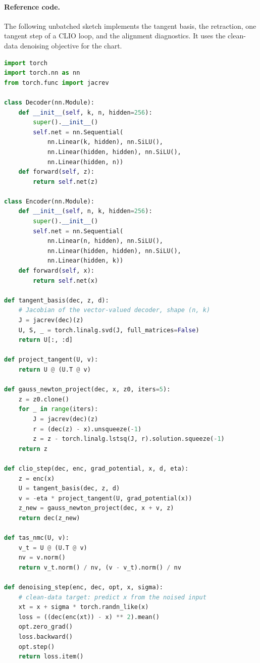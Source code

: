 \documentclass[11pt,a4paper]{article}
\theoremstyle{definition}
\theoremstyle{remark}
\begin{document}
\paragraph{Reference code.} The following unbatched sketch implements the
tangent basis, the retraction, one tangent step of a CLIO loop, and the
alignment diagnostics. It uses the clean-data denoising objective for the
chart.

\begin{lstlisting}[language=Python,caption={Tangent step, retraction and diagnostics (unbatched).}]
import torch
import torch.nn as nn
from torch.func import jacrev

class Decoder(nn.Module):
    def __init__(self, k, n, hidden=256):
        super().__init__()
        self.net = nn.Sequential(
            nn.Linear(k, hidden), nn.SiLU(),
            nn.Linear(hidden, hidden), nn.SiLU(),
            nn.Linear(hidden, n))
    def forward(self, z):
        return self.net(z)

class Encoder(nn.Module):
    def __init__(self, n, k, hidden=256):
        super().__init__()
        self.net = nn.Sequential(
            nn.Linear(n, hidden), nn.SiLU(),
            nn.Linear(hidden, hidden), nn.SiLU(),
            nn.Linear(hidden, k))
    def forward(self, x):
        return self.net(x)

def tangent_basis(dec, z, d):
    # Jacobian of the vector-valued decoder, shape (n, k)
    J = jacrev(dec)(z)
    U, S, _ = torch.linalg.svd(J, full_matrices=False)
    return U[:, :d]

def project_tangent(U, v):
    return U @ (U.T @ v)

def gauss_newton_project(dec, x, z0, iters=5):
    z = z0.clone()
    for _ in range(iters):
        J = jacrev(dec)(z)
        r = (dec(z) - x).unsqueeze(-1)
        z = z - torch.linalg.lstsq(J, r).solution.squeeze(-1)
    return z

def clio_step(dec, enc, grad_potential, x, d, eta):
    z = enc(x)
    U = tangent_basis(dec, z, d)
    v = -eta * project_tangent(U, grad_potential(x))
    z_new = gauss_newton_project(dec, x + v, z)
    return dec(z_new)

def tas_nmc(U, v):
    v_t = U @ (U.T @ v)
    nv = v.norm()
    return v_t.norm() / nv, (v - v_t).norm() / nv

def denoising_step(enc, dec, opt, x, sigma):
    # clean-data target: predict x from the noised input
    xt = x + sigma * torch.randn_like(x)
    loss = ((dec(enc(xt)) - x) ** 2).mean()
    opt.zero_grad()
    loss.backward()
    opt.step()
    return loss.item()
\end{lstlisting}
\end{document}
